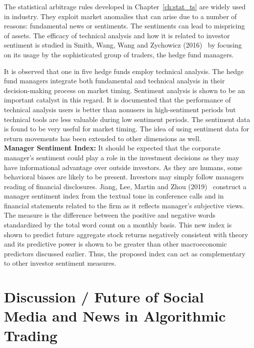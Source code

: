 The statistical arbitrage rules developed in Chapter~\ref{ch:stat_ts} are widely used in industry. They exploit market anomalies that can arise due to a number of reasons: fundamental news or sentiments. The sentiments can lead to mispricing of assets. The efficacy of technical analysis and how it is related to investor sentiment is studied in Smith, Wang, Wang and Zychowicz (2016)~\cite{smithwangwangzy16} by focusing on its usage by the sophisticated group of traders, the hedge fund managers. 


It is observed that one in five hedge funds employ technical analysis. The hedge fund managers integrate both fundamental and technical analysis in their decision-making process on market timing. Sentiment analysis is shown to be an important catalyst in this regard. It is documented that the performance of technical analysis users is better than nonusers in high-sentiment periods but technical tools are less valuable during low sentiment periods. The sentiment data is found to be very useful for market timing. The idea of using sentiment data for return movements has been extended to other dimensions as well. \\


\noindent\textbf{Manager Sentiment Index:} It should be expected that the corporate manager's sentiment could play a role in the investment decisions as they may have informational advantage over outside investors. As they are humans, some behavioral biases are likely to be present. Investors may simply follow managers reading of financial disclosures. Jiang, Lee, Martin and Zhou (2019)~\cite{jianleemartin} construct a manager sentiment index from the textual tone in conference calls and in financial statements related to the firm as it reflects manager's subjective views. The measure is the difference between the positive and negative words standardized by the total word count on a monthly basis. This new index is shown to predict future aggregate stock returns negatively consistent with theory and its predictive power is shown to be greater than other macroeconomic predictors discussed earlier. Thus, the proposed index can act as complementary to other investor sentiment measures. 



\section{Discussion / Future of Social Media and News in Algorithmic Trading}

